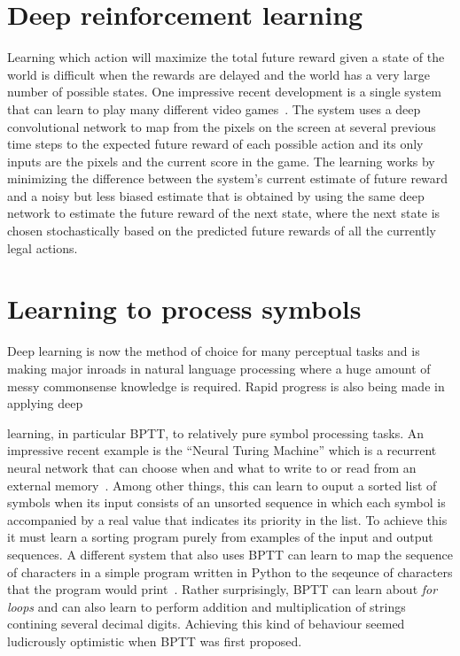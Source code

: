 \documentclass[]{article}
\begin{document}
\section{Deep reinforcement learning}

Learning which action will maximize the total future reward given a state of the world is difficult when the rewards are
delayed and the world has a very large number of possible states. One impressive recent development is a single system
that can learn to play many different video games~\cite{NatureAtari}. The system uses a deep convolutional network to
map from the pixels on the screen at several previous time steps to the expected future reward of each possible action
and its only inputs are the pixels and the current score in the game. The learning works by minimizing the difference
between the system's current estimate of future reward and a noisy but less biased estimate that is obtained by using
the same deep network to estimate the future reward of the next state, where the next state is chosen stochastically
based on the predicted future rewards of all the currently legal actions.

\section{Learning to process symbols}

Deep learning is now the method of choice for many perceptual tasks and is making major inroads in natural language
processing where a huge amount of messy commonsense knowledge is required. Rapid progress is also being made in applying deep

learning, in particular BPTT, to relatively pure symbol processing tasks.  An impressive recent example is the ``Neural
Turing Machine'' which is a recurrent neural network that can choose when and what to write to or read from an external
memory~\cite{NTM}. Among other things, this can learn to ouput a sorted list of symbols when its input consists of an
unsorted sequence in which each symbol is accompanied by a real value that indicates its priority in the list.  To
achieve this it must learn a sorting program purely from examples of the input and output sequences.  A different system
that also uses BPTT can learn to map the sequence of characters in a simple program written in Python to the seqeunce of
characters that the program would print~\cite{Woj}. Rather surprisingly, BPTT can learn about {\it for loops} and can
also learn to perform addition and multiplication of strings contining several decimal digits. Achieving this kind of
behaviour seemed ludicrously optimistic when BPTT was first proposed.
  
\end{document}
